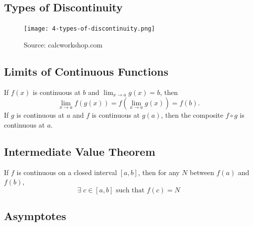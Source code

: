 \documentclass[a4paper,11pt]{article}
\begin{document}


\subsection{Types of Discontinuity}

\begin{figure}[htbp]
    \centering
    \texttt{[image: 4-types-of-discontinuity.png]} 
    \caption{Source: calcworkshop.com}
    \label{fig:discontinuity}
\end{figure}



\subsection{Limits of Continuous Functions}

\begin{tcolorbox}
    If \( f(x) \) is continuous at \( b \) and \( \displaystyle \lim_{x \to a} g(x) = b \),  then
    \[ \lim_{x \to a} f(g(x)) = f( \lim_{x \to a} g(x) ) = f(b). \]
    \tcblower
    If \( g \) is continuous at \( a \) and \( f \) is continuous at \( g(a) \), then the composite \( f \circ g \) is continuous at \( a \).
\end{tcolorbox}




\subsection{Intermediate Value Theorem}

\begin{tcolorbox}
    If \( f \) is continuous on a closed interval \( [a, b] \), then for any \( N \) between \( f(a) \) and \( f(b) \),  
    \[
    \exists \; c \in [a,b] \text{ such that } f(c) = N
    \]
\end{tcolorbox}




\subsection{Asymptotes}
\end{document}
